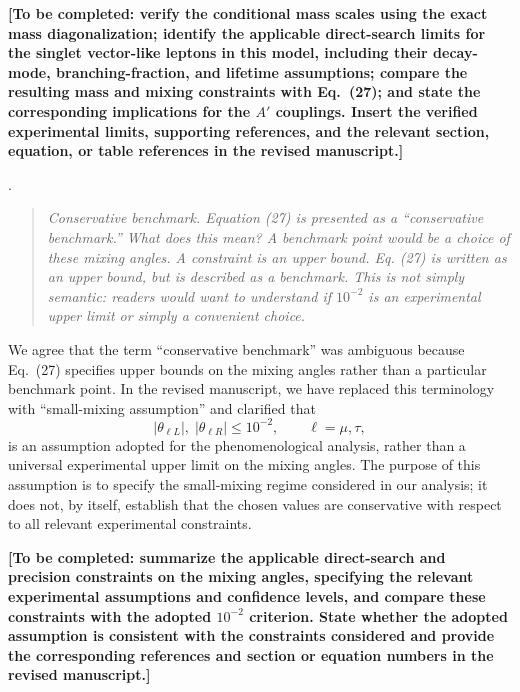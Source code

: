 \documentclass[12pt,a4paper]{article}
\begin{document}
\textbf{[To be completed: verify the conditional mass scales using the exact mass diagonalization; identify the applicable direct-search limits for the singlet vector-like leptons in this model, including their decay-mode, branching-fraction, and lifetime assumptions; compare the resulting mass and mixing constraints with Eq.~(27); and state the corresponding implications for the \(A'\) couplings. Insert the verified experimental limits, supporting references, and the relevant section, equation, or table references in the revised manuscript.]}

\medskip
{}.
\begin{quote}\itshape
Conservative benchmark. Equation (27) is presented as a ``conservative benchmark.'' What does this mean? A benchmark point would be a choice of these mixing angles. A constraint is an upper bound. Eq. (27) is written as an upper bound, but is described as a benchmark. This is not simply semantic: readers would want to understand if \(10^{-2}\) is an experimental upper limit or simply a convenient choice.
\end{quote}

We agree that the term ``conservative benchmark'' was ambiguous because Eq.~(27) specifies upper bounds on the mixing angles rather than a particular benchmark point. In the revised manuscript, we have replaced this terminology with ``small-mixing assumption'' and clarified that
\[
|\theta_{\ell L}|,\;|\theta_{\ell R}|\leq10^{-2},
\qquad \ell=\mu,\tau,
\]
is an assumption adopted for the phenomenological analysis, rather than a universal experimental upper limit on the mixing angles. The purpose of this assumption is to specify the small-mixing regime considered in our analysis; it does not, by itself, establish that the chosen values are conservative with respect to all relevant experimental constraints.

\textbf{[To be completed: summarize the applicable direct-search and precision constraints on the mixing angles, specifying the relevant experimental assumptions and confidence levels, and compare these constraints with the adopted \(10^{-2}\) criterion. State whether the adopted assumption is consistent with the constraints considered and provide the corresponding references and section or equation numbers in the revised manuscript.]}
\end{document}

